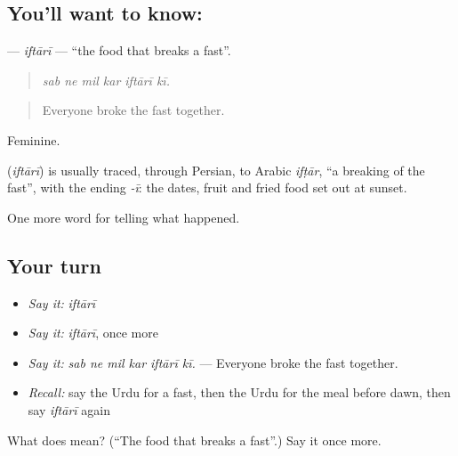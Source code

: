 \subsection*{You'll want to know: }
\textbf{} — \emph{iftārī} — \textquotedblleft{}the food that breaks a fast\textquotedblright{}.

\begin{quote}
     
\end{quote}

\begin{quote}
\emph{sab ne mil kar iftārī kī.}
\end{quote}

\begin{quote}
Everyone broke the fast together.
\end{quote}

Feminine.

\begin{cousinweb}
\textbf{} (\emph{iftārī}) is usually traced, through Persian, to Arabic \emph{ifṭār}, \textquotedblleft{}a breaking of the fast\textquotedblright{}, with the ending \emph{-ī}: the dates, fruit and fried food set out at sunset.
\end{cousinweb}

\begin{grammarlens}[title={What you've built}]
One more word for telling what happened.
\end{grammarlens}

\subsection*{Your turn}
\begin{itemize}
\raggedright
  \item \emph{Say it:} \emph{iftārī}
  \item \emph{Say it:} \emph{iftārī}, once more
  \item \emph{Say it:} \emph{sab ne mil kar iftārī kī.} — Everyone broke the fast together.
  \item \emph{Recall:} say the Urdu for a fast, then the Urdu for the meal before dawn, then say \emph{iftārī} again
\end{itemize}

\begin{tcolorbox}[breakable,colback=teal!4,colframe=teal!35!black,title={Before you move on}]
What does  mean? (\textquotedblleft{}The food that breaks a fast\textquotedblright{}.) Say it once more.
\end{tcolorbox}
